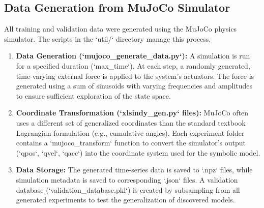 \documentclass[12pt]{article}
\begin{document}
\subsection*{Data Generation from MuJoCo Simulator}
All training and validation data were generated using the MuJoCo physics simulator. The scripts in the `util/` directory manage this process.
\begin{enumerate}
    \item \textbf{Data Generation (`mujoco\_generate\_data.py`):} A simulation is run for a specified duration (`max\_time`). At each step, a randomly generated, time-varying external force is applied to the system's actuators. The force is generated using a sum of sinusoids with varying frequencies and amplitudes to ensure sufficient exploration of the state space.
    \item \textbf{Coordinate Transformation (`xlsindy\_gen.py` files):} MuJoCo often uses a different set of generalized coordinates than the standard textbook Lagrangian formulation (e.g., cumulative angles). Each experiment folder contains a `mujoco\_transform` function to convert the simulator's output (`qpos`, `qvel`, `qacc`) into the coordinate system used for the symbolic model.
    \item \textbf{Data Storage:} The generated time-series data is saved to `.npz` files, while simulation metadata is saved to corresponding `.json` files. A validation database (`validation\_database.pkl`) is created by subsampling from all generated experiments to test the generalization of discovered models.
\end{enumerate}
\end{document}
